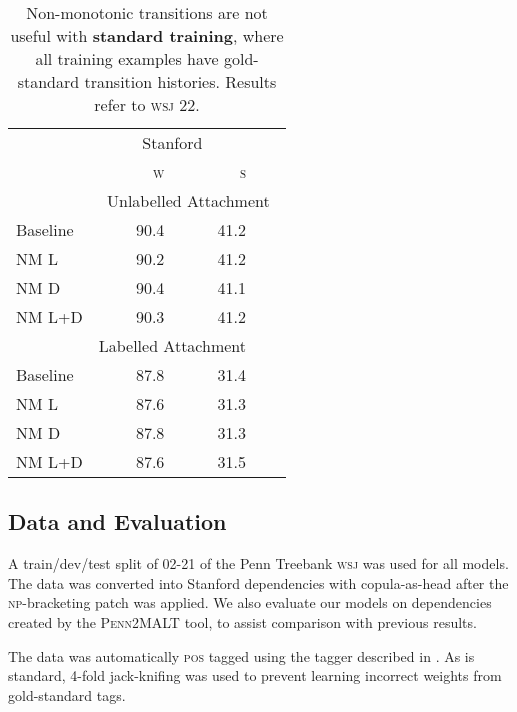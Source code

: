 \documentclass[11pt,letterpaper]{article}
\newcommand{\pos}{\textsc{pos}\xspace}
\newcommand{\wsj}{\textsc{wsj}\xspace}
\begin{document}
\begin{table}[t]

    \small
    \centering
    \begin{tabular}{l|rrrr}
        \hline
        & \multicolumn{2}{c}{Stanford} \\
        & \textsc{w}  & \textsc{s} \\
\hline \hline
        & \multicolumn{4}{c}{Unlabelled Attachment} \\
        \hline
Baseline & 90.4 & 41.2 \\
NM L & 90.2 & 41.2 \\
NM D & 90.4 & 41.1 \\
NM L+D & 90.3 & 41.2\\
\hline
            & \multicolumn{2}{c}{Labelled Attachment} \\
            \hline
Baseline & 87.8 & 31.4 \\
NM L & 87.6 & 31.3 \\
NM D & 87.8 & 31.3 \\
NM L+D & 87.6 & 31.5 \\
\hline
    \end{tabular}
    \caption{\small Non-monotonic transitions are not useful with
        \textbf{standard training},
where all training examples have gold-standard transition histories. Results refer to
\wsj 22.\label{tab:standard}}
\end{table}


\subsection{Data and Evaluation}

A train/dev/test split of 02-21 of the Penn Treebank \textsc{wsj} \citep{marcus:94}
was used for all models. The data was converted into
Stanford dependencies \citep{stanford_deps} with copula-as-head after the \citet{vadas:07}
\textsc{np}-bracketing patch was applied. We also evaluate our models on
dependencies created by the \textsc{Penn2MALT} tool, to assist comparison 
with previous results.

The data was automatically \pos tagged using the tagger described in \citep{zhang_pos:11}.
As is standard, 4-fold jack-knifing was used to prevent learning incorrect
weights from gold-standard tags.
\end{document}
